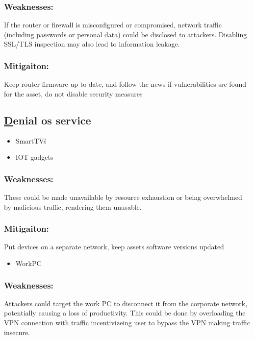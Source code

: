 \documentclass[
	letterpaper, %
	10pt, %
	unnumberedsections, %
	twoside, %
]{APAAssignment}
\begin{document}
\begin{singlespace}
	\subsubsection{Weaknesses:} If the router or firewall is misconfigured or compromised, network traffic (including passwords or personal data) could be disclosed to attackers. Disabling SSL/TLS inspection may also lead to information leakage.
	\subsubsection{Mitigaiton:} Keep router firmware up to date, and follow the news if vulnerabilities sre found for the asset, do not disable security measures
	
	
\end{singlespace}

\begin{singlespace}
\subsection{\underline{D}enial os service}


	\begin{itemize}
		\item SmartTV\'s
		\item IOT gadgets 
	\end{itemize}
	
	\subsubsection{Weaknesses:} These could be made unavailable by resource exhaustion or being overwhelmed by malicious traffic, rendering them unusable.
	\subsubsection{Mitigaiton:} Put devices on a separate network, keep assets software versions updated
	
	\begin{itemize}
		\item WorkPC
	\end{itemize}
	
	\subsubsection{Weaknesses:} Attackers could target the work PC to disconnect it from the corporate network, potentially causing a loss of productivity. This could be done by overloading the VPN connection with traffic incentivizeing user to bypass the VPN making traffic insecure.

\end{singlespace}
\end{document}
